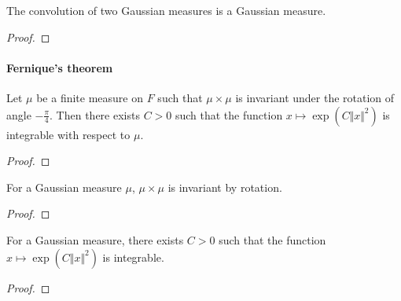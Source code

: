 \begin{lemma}\label{lem:isGaussian_conv}
  \mathlibok
The convolution of two Gaussian measures is a Gaussian measure.
\end{lemma}

\begin{proof}\leanok

\end{proof}



\paragraph{Fernique's theorem}


\begin{theorem}\label{thm:exists_integrable_exp_sq_of_map_rotation_eq_self}
  \leanok
Let $\mu$ be a finite measure on $F$ such that $\mu \times \mu$ is invariant under the rotation of angle $-\frac{\pi}{4}$.
Then there exists $C > 0$ such that the function $x \mapsto \exp (C \Vert x \Vert ^ 2)$ is integrable with respect to $\mu$.
\end{theorem}

\begin{proof}\leanok

\end{proof}


\begin{lemma}\label{lem:IsGaussian.map_rotation_eq_self}
  \leanok
For a Gaussian measure $\mu$, $\mu \times \mu$ is invariant by rotation.
\end{lemma}

\begin{proof}\leanok

\end{proof}


\begin{theorem}\label{thm:IsGaussian.exists_integrable_exp_sq}
  \leanok
For a Gaussian measure, there exists $C > 0$ such that the function $x \mapsto \exp (C \Vert x \Vert ^ 2)$ is integrable.
\end{theorem}

\begin{proof}\leanok

\end{proof}


